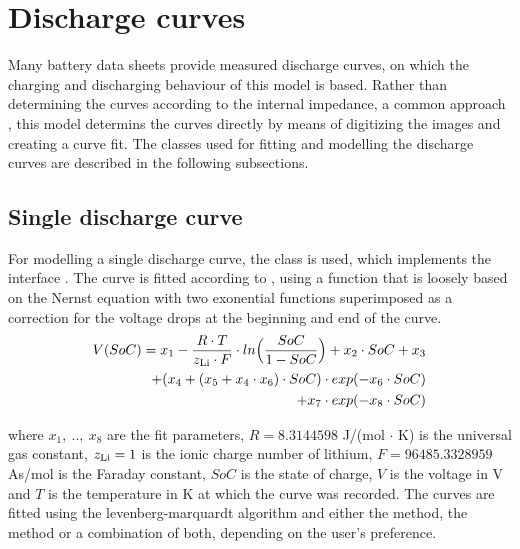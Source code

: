 \section{Discharge curves} \label{sec:dischargeCurves}
Many battery data sheets provide measured discharge curves, on which the charging and discharging behaviour of this model is based. Rather than determining the curves according to the internal impedance, a common approach \cite{lijun_gao_dynamic_2002}, this model determins the curves directly by means of digitizing the images and creating a curve fit. The classes used for fitting and modelling the discharge curves are described in the following subsections.

\subsection{Single discharge curve}
For modelling a single discharge curve, the class  is used, which implements the interface . The curve is fitted according to \cite{werder_entwicklung_2014}, using a function that is loosely based on the Nernst equation with two exonential functions superimposed as a correction for the voltage drops at the beginning and end of the curve.
\begin{equation}
\begin{aligned}
V(SoC) = x_1 - \frac{R\cdot T}{z_\text{Li}\cdot F}\cdot ln\Big(\frac{SoC}{1-SoC}\Big)
+ x_2\cdot SoC + x_3 \\
+ (x_4 + (x_5 + x_4\cdot x_6)\cdot SoC)\cdot exp(-x_6\cdot SoC) \\
+ x_7\cdot exp(-x_8\cdot SoC)
\end{aligned}
\end{equation}

where $x_1,\ ..,\ x_8$ are the fit parameters, $R = 8.3144598$ J/(mol $\cdot$ K) is the universal gas constant, $z_\text{Li} = 1$ is the ionic charge number of lithium, $F = 96485.3328959$ As/mol is the Faraday constant, $SoC$ is the state of charge, $V$ is the voltage in V and $T$ is the temperature in K at which the curve was recorded. The curves are fitted using the levenberg-marquardt algorithm and either the  method, the  method or a combination of both, depending on the user's preference. 

